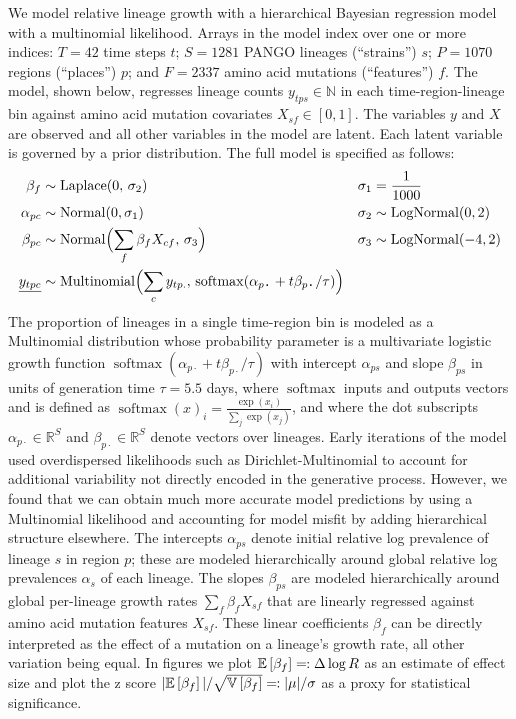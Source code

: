 \documentclass[12pt]{article}
\newcommand \blank {{\,\pmb\cdot\,}}
\begin{document}
We model relative lineage growth with a hierarchical Bayesian regression model with a multinomial likelihood.
Arrays in the model index over one or more indices: $T{=}42$ time steps $t$; $S{=}1281$ PANGO lineages (``strains'') $s$; $P{=}1070$ regions (``places'') $p$; and $F{=}2337$ amino acid mutations (``features'') $f$.
The model, shown below, regresses lineage counts $y_{tps}\in\mathbb N$ in each time-region-lineage bin against amino acid mutation covariates $X_{sf} \in [0,1]$.
The variables $y$ and $X$ are observed and all other variables in the model are latent. Each latent variable is governed by a prior distribution.
The full model is specified as follows:
\begin{align*}
  \textstyle
  \beta_f &\sim \operatorname{Laplace}(0,\, \sigma_2) &
  \sigma_1 &= \frac{1}{1000} \\
  \alpha_{pc} &\sim \operatorname{Normal}(0, \sigma_1) &
  \sigma_2 &\sim \operatorname{LogNormal}(0, 2) \\
  \beta_{pc} &\sim \operatorname{Normal}\Bigl(
   \sum_f \beta_f X_{cf},\, \sigma_3
  \Bigr) &
  \sigma_3 &\sim \operatorname{LogNormal}(-4, 2) \\
  \underline{y_{tpc}} &\sim \operatorname{Multinomial}\Bigl(
    \sum_c y_{tp.},\, \operatorname{softmax}(\alpha_{p\blank} + t\beta_{p\blank}/\tau)
  \Bigr)
\end{align*}
The proportion of lineages in a single time-region bin is modeled as a Multinomial distribution whose probability parameter is a multivariate logistic growth function $\operatorname{softmax}(\alpha_{p\blank} + t\beta_{p\blank}/\tau)$ with intercept $\alpha_{ps}$ and slope $\beta_{ps}$ in units of generation time $\tau=5.5$ days, where $\operatorname{softmax}$ inputs and outputs vectors and is defined as
${
  \operatorname{softmax}(x)_i = \frac {\exp(x_i)} {\sum_j \exp(x_j)}
}$, and where the dot subscripts $\alpha_{p\blank}\in\mathbb R^S$ and $\beta_{p\blank}\in\mathbb R^S$ denote vectors over lineages.
Early iterations of the model used overdispersed likelihoods such as Dirichlet-Multinomial to account for additional variability not directly encoded in the generative process.
However, we found that we can obtain much more accurate model predictions by using a Multinomial likelihood and accounting for model misfit by adding hierarchical structure elsewhere.
The intercepts $\alpha_{ps}$ denote initial relative log prevalence of lineage $s$ in region $p$; these are modeled hierarchically around global relative log prevalences $\alpha_s$ of each lineage.
The slopes $\beta_{ps}$ are modeled hierarchically around global per-lineage growth rates $\sum_f \beta_f X_{sf}$ that are linearly regressed against amino acid mutation features $X_{sf}$.
These linear coefficients $\beta_f$ can be directly interpreted as the effect of a mutation on a lineage's growth rate, all other variation being equal.
In figures we plot ${\mathbb E\left[\beta_f\right] =\hspace{-0.1ex}: \Delta\log R}$ as an estimate of effect size and plot the z score
${
  |\mathbb E\left[\beta_f\right]| / \sqrt{\mathbb V\left[\beta_f\right]} =\hspace{-0.1ex}: |\mu|/\sigma
}$
as a proxy for statistical significance.
\end{document}

